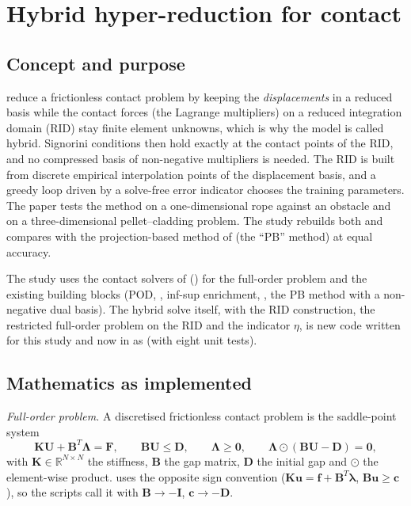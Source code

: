 \section{Hybrid hyper-reduction for contact}\label{sec:vf-hyb}

\subsection*{Concept and purpose}

\citet{fauque2018hybrid} reduce a frictionless contact problem by keeping the \emph{displacements} in a reduced basis while the contact forces (the Lagrange multipliers) on a reduced integration domain (RID) stay finite element unknowns, which is why the model is called hybrid. Signorini conditions then hold exactly at the contact points of the RID, and no compressed basis of non-negative multipliers is needed. The RID is built from discrete empirical interpolation points of the displacement basis, and a greedy loop driven by a solve-free error indicator chooses the training parameters. The paper tests the method on a one-dimensional rope against an obstacle and on a three-dimensional pellet--cladding problem. The study rebuilds both and compares with the projection-based method of  (the ``PB'' method) at equal accuracy.

The study uses the contact solvers of \fea{} () for the full-order problem and the existing \rom{} building blocks (POD, , inf-sup enrichment, , the PB method with a non-negative dual basis). The hybrid solve itself, with the RID construction, the restricted full-order problem on the RID and the indicator $\eta$, is new code written for this study and now in \rom{} as  (with eight unit tests).

\subsection*{Mathematics as implemented}

\emph{Full-order problem.} A discretised frictionless contact problem is the saddle-point system
\begin{equation}\label{eq:hb-fom}
\mathbf K\mathbf U+\mathbf B^{T}\boldsymbol\Lambda=\mathbf F,\qquad\mathbf B\mathbf U\le\mathbf D,\qquad\boldsymbol\Lambda\ge\mathbf 0,\qquad\boldsymbol\Lambda\odot(\mathbf B\mathbf U-\mathbf D)=\mathbf 0,
\end{equation}
with $\mathbf K\in\mathbb R^{N\times N}$ the stiffness, $\mathbf B$ the gap matrix, $\mathbf D$ the initial gap and $\odot$ the element-wise product. \fea{} uses the opposite sign convention ($\mathbf K\mathbf u=\mathbf f+\mathbf B^{T}\boldsymbol\lambda$, $\mathbf B\mathbf u\ge\mathbf c$), so the scripts call it with $\mathbf B\to-\mathbf I$, $\mathbf c\to-\mathbf D$.

